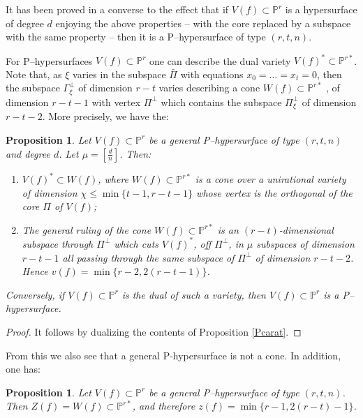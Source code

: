 \documentclass[11pt]{article}   %
\newtheorem{Proposition}[Theorem]{Proposition}
\theoremstyle{definition}
\numberwithin{Theorem}{section} \numberwithin{equation}{section}
\newcommand{\p}{{\mathbb P}}
\begin{document}
{It has been proved in \cite[pp. 100--101] {Permutti3} a converse to
the effect that if $V(f)\subset\p^r$ is a hypersurface of degree $d$ enjoying
the above properties -- with the core replaced by a subspace with
the same property -- then it is a P--hypersurface of type $(r,t,n)$.

For P--hypersurfaces $V(f)\subset\p^r$ one can describe the dual variety
$V(f)^*\subset\p^{r*}$. Note that, as $\xi$ varies in the subspace $\bar \Pi$
with equations $x_0=\dots=x_t=0$, then the subspace
$\Gamma_\xi^ \perp$ of dimension $r-t$ varies
describing a cone $W(f)\subset\p^{r*}$ , of
dimension $r-t-1$ with vertex $\Pi^ \perp$ which contains
the subspace $\Pi_\xi^ \perp$ of dimension $r-t-2$.
More precisely, we have the:

\begin{Proposition}\label{Pdual} Let $V(f)\subset\p^r$ be a general {\rm P}--hypersurface
of type $(r,t,n)$ and degree $d$. Let $\mu=[\frac dn]$. Then:
\begin{enumerate}
\item[{\rm (i)}]  $V(f)^*\subset W(f)$, where $W(f)\subset\p^{r*}$ is a cone over a
unirational variety of dimension $\chi\leq \min\{t-1,r-t-1\}$ whose
vertex is the orthogonal of the core $\Pi$ of $V(f)${\rm ;}
\item[{\rm (ii)}]  The general ruling
of the cone $W(f)\subset\p^{r*}$ is an $(r-t)$-dimensional subspace through $\Pi^
\perp$ which cuts $V(f)^ *$, off $\Pi^ \perp$, in $\mu$ subspaces of
dimension $r-t-1$  all passing through the same subspace of $\Pi^
\perp$ of dimension $r-t-2$. Hence $v(f)=\min\{r-2,2(r-t-1)\}$.
\end{enumerate}
Conversely, if $V(f)\subset\p^r$ is the dual of such a variety, then
$V(f)\subset\p^r$ is a {\rm P}--hypersurface.
\end{Proposition}
\begin{proof} It follows by dualizing the contents of Proposition \ref{Pcarat}.
\end{proof}

From this we also see that a general {\rm P}-hypersurface is not a
cone. In addition, one has:

\begin{Proposition}\label{Pzeta} Let $V(f)\subset\p^r$ be a general {\rm P}--hypersurface
of type $(r,t,n)$. Then  $Z(f)=W(f)\subset\p^{r*}$, and therefore
$z(f)=\min\{r-1,2(r-t)-1\}$.
\end{Proposition}

}
\end{document}

